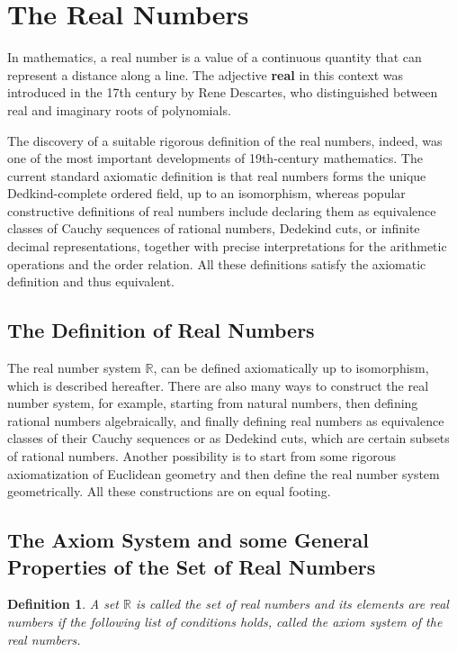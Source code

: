 \documentclass[a4paper,12pt]{article} %
\newtheorem{definition}{Definition}[section]
\begin{document}
\section{The Real Numbers}
In mathematics, a real number is a value of a continuous quantity 
that can represent a distance along a line. The adjective \textbf{real}
in this context was introduced in the 17th century by Rene Descartes,
who distinguished between real and imaginary roots of polynomials.

The discovery of a suitable rigorous definition of the real numbers,
indeed, was one of the most important developments of 19th-century 
mathematics. The current standard axiomatic definition is that 
real numbers forms the unique Dedkind-complete ordered field, up to 
an isomorphism, whereas popular constructive definitions of 
real numbers include declaring them as equivalence classes of 
Cauchy sequences of rational numbers, Dedekind cuts, 
or infinite decimal representations, together with precise 
interpretations for the arithmetic operations and the order 
relation. All these definitions satisfy the axiomatic 
definition and thus equivalent.

\subsection{The Definition of Real Numbers}
The real number system $\mathbb{R}$, can be defined axiomatically 
up to isomorphism, which is described hereafter. There are also 
many ways to construct the real number system, for example, starting
from natural numbers, then defining rational numbers algebraically,
and finally defining real numbers as equivalence classes of their 
Cauchy sequences or as Dedekind cuts, which are certain subsets 
of rational numbers. Another possibility is to start from some 
rigorous axiomatization of Euclidean geometry and then define 
the real number system geometrically. All these constructions 
are on equal footing.

\subsection{The Axiom System and some General Properties of the 
Set of Real Numbers}
\begin{definition} {A set $\mathbb{R}$ is called the set of \textit{real numbers}
and its elements are \textit{real numbers} if the following list of conditions
holds, called the axiom system of the real numbers.}
\end{definition}
\end{document}
